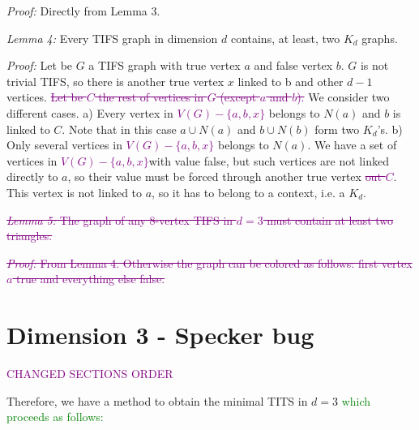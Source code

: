 \documentclass[%
  twocolumn,
 showpacs,
 showkeys,
 preprintnumbers,
 amsmath,amssymb,
 aps,
  pra,
  longbibliography,
 floatfix,
 ]{revtex4-1}
\newcommand{\karllate}[1]{\textcolor{green}{#1}}
\newcommand{\jr}[1]{\textcolor{purple}{#1}}
\def\endproof{ }
\begin{document}

{\em Proof:} Directly from Lemma 3. \endproof


{\em Lemma 4:} Every TIFS graph in dimension $d$ contains, at least, two $K_d$ graphs.


{\em Proof:} %
 Let be $G$ a TIFS graph with true vertex $a$ and false vertex $b$.
$G$ is not trivial TIFS, so there is another true vertex $x$ linked to b and other $d-1$ vertices.
\jr{\sout{Let be $C$ the rest of vertices in $G$ (except $a$ and $b$).}} %
We consider two different cases.
a) Every vertex in \jr{$V(G)-\{a,b,x\}$} belongs to $N(a)$ and $b$ is linked to $C$.
Note that in this case $a \cup N(a)$ and $b \cup N(b)$ form two $K_d$'s.
b) Only several vertices in \jr{$V(G)-\{a,b,x\}$} belongs to $N(a)$.
We have a set of vertices in \jr{$V(G)-\{a,b,x\}$}with value false,
but such vertices are not linked directly to $a$,
so their value must be forced through another true vertex \jr{\sout{out $C$}}.
This vertex is not linked to $a$, so it has to belong to a context, i.e. a $K_d$.\endproof



\jr{\sout{{\em Lemma 5:} The graph of any 8-vertex TIFS in $d=3$ must contain at least two triangles.}}


\jr{\sout{{\em Proof:} From Lemma 4. Otherwise the graph can be colored as follows: first vertex $a$ true and everything else false. \endproof}}


\section{Dimension 3 - Specker bug}

\jr{CHANGED SECTIONS ORDER}

Therefore, we have a method to obtain the minimal TITS in $d=3$ \karllate{which proceeds as follows:}
\end{document}
